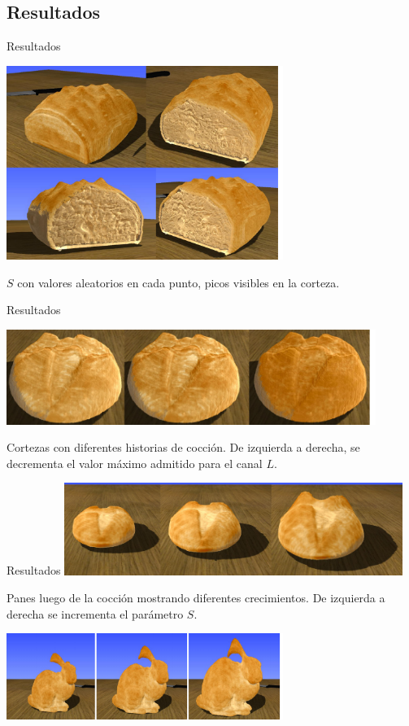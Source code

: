 \documentclass[spanish,unknownkeysallowed]{beamer}
\begin{document}
\subsection{Resultados}

\begin{frame}{Resultados}

\centerline{\includegraphics[width=9cm]{../figures/Fig11}}

$S$ con valores aleatorios en cada punto, picos visibles en la corteza.

\end{frame}

\begin{frame}{Resultados}

\centerline{\includegraphics[width=12cm]{../figures/Fig13}}
Cortezas con diferentes historias de cocción. De izquierda a derecha, se decrementa el valor máximo admitido para el canal $L$.

\end{frame}

\begin{frame}{Resultados}
\includegraphics[width=11cm]{../figures/Fig14}

Panes luego de la cocción mostrando diferentes crecimientos. De izquierda a derecha se incrementa el parámetro $S$.

\includegraphics[width=9cm]{../figures/Fig15}


\end{frame}
\end{document}
